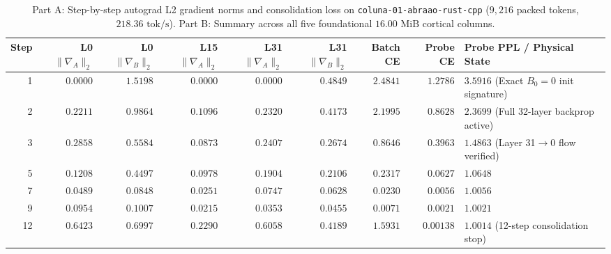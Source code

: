 \documentclass[10pt,a4paper]{article}
\begin{document}
\begin{table}[!htbp]
\centering
\caption{Part A: Step-by-step autograd L2 gradient norms and consolidation loss on \texttt{coluna-01-abraao-rust-cpp} ($9,216$ packed tokens, $218.36\text{ tok/s}$). Part B: Summary across all five foundational $16.00\text{ MiB}$ cortical columns.}
\label{tab:autograd}
\footnotesize
\begin{tabularx}{\linewidth}{@{}rrrrrrrrY@{}}
\toprule
\textbf{Step} & \textbf{L0 $\|\nabla_A\|_2$} & \textbf{L0 $\|\nabla_B\|_2$} & \textbf{L15 $\|\nabla_A\|_2$} & \textbf{L31 $\|\nabla_A\|_2$} & \textbf{L31 $\|\nabla_B\|_2$} & \textbf{Batch CE} & \textbf{Probe CE} & \textbf{Probe PPL / Physical State} \\
  & $0.0000$ & $1.5198$ & $0.0000$ & $0.0000$ & $0.4849$ & $2.4841$ & $1.2786$ & $3.5916$ (Exact $B_0=0$ init signature) \\
2  & $0.2211$ & $0.9864$ & $0.1096$ & $0.2320$ & $0.4173$ & $2.1995$ & $0.8628$ & $2.3699$ (Full 32-layer backprop active) \\
3  & $0.2858$ & $0.5584$ & $0.0873$ & $0.2407$ & $0.2674$ & $0.8646$ & $0.3963$ & $1.4863$ (Layer 31$\to$0 flow verified) \\
5  & $0.1208$ & $0.4497$ & $0.0978$ & $0.1904$ & $0.2106$ & $0.2317$ & $0.0627$ & $1.0648$ \\
7  & $0.0489$ & $0.0848$ & $0.0251$ & $0.0747$ & $0.0628$ & $0.0230$ & $0.0056$ & $1.0056$ \\
9  & $0.0954$ & $0.1007$ & $0.0215$ & $0.0353$ & $0.0455$ & $0.0071$ & $0.0021$ & $1.0021$ \\
12 & $0.6423$ & $0.6997$ & $0.2290$ & $0.6058$ & $0.4189$ & $1.5931$ & $\mathbf{0.00138}$ & $\mathbf{1.0014}$ (12-step consolidation stop) \\
\bottomrule
\end{tabularx}


\end{table}
\end{document}
